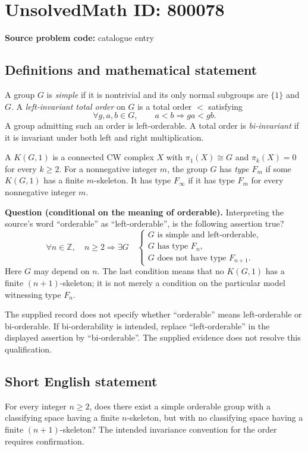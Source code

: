 \documentclass[11pt]{article}
\newcommand{\Z}{\mathbb{Z}}
\begin{document}
\section*{UnsolvedMath ID: 800078}
\textbf{Source problem code:} catalogue entry
\subsection{Definitions and mathematical statement}
A group \(G\) is \emph{simple} if it is nontrivial and its only normal subgroups are \(\{1\}\) and \(G\). A \emph{left-invariant total order} on \(G\) is a total order \(<\) satisfying
\[
\forall g,a,b\in G,\qquad a<b\Longrightarrow ga<gb.
\]
A group admitting such an order is left-orderable. A total order is \emph{bi-invariant} if it is invariant under both left and right multiplication.

A \(K(G,1)\) is a connected CW complex \(X\) with \(\pi_1(X)\cong G\) and \(\pi_k(X)=0\) for every \(k\geq2\). For a nonnegative integer \(m\), the group \(G\) has \emph{type \(F_m\)} if some \(K(G,1)\) has a finite \(m\)-skeleton. It has type \(F_\infty\) if it has type \(F_m\) for every nonnegative integer \(m\).

\textbf{Question (conditional on the meaning of orderable).} Interpreting the source's word ``orderable'' as ``left-orderable'', is the following assertion true?
\[
\forall n\in\Z,\quad n\geq2\Longrightarrow
\exists G\quad
\left\{
\begin{array}{l}
G\text{ is simple and left-orderable},\\
G\text{ has type }F_n,\\
G\text{ does not have type }F_{n+1}.
\end{array}
\right.
\]
Here \(G\) may depend on \(n\). The last condition means that no \(K(G,1)\) has a finite \((n+1)\)-skeleton; it is not merely a condition on the particular model witnessing type \(F_n\).

The supplied record does not specify whether ``orderable'' means left-orderable or bi-orderable. If bi-orderability is intended, replace ``left-orderable'' in the displayed assertion by ``bi-orderable''. The supplied evidence does not resolve this qualification.
\subsection{Short English statement}
For every integer \(n\geq2\), does there exist a simple orderable group with a classifying space having a finite \(n\)-skeleton, but with no classifying space having a finite \((n+1)\)-skeleton? The intended invariance convention for the order requires confirmation.
\end{document}
